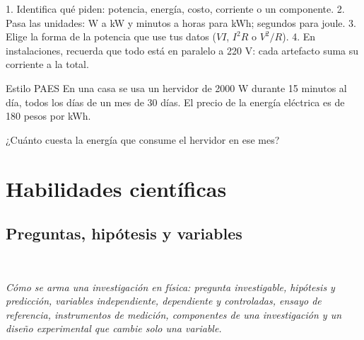 \begin{clave} 1. Identifica qué piden: potencia, energía, costo, corriente o un componente. 2. Pasa las unidades: W a kW y minutos a horas para kWh; segundos para joule. 3. Elige la forma de la potencia que use tus datos ($VI$, $I^2R$ o $V^2/R$). 4. En instalaciones, recuerda que todo está en paralelo a 220 V: cada artefacto suma su corriente a la total.\end{clave}
\begin{elejemplo}{Estilo PAES}
En una casa se usa un hervidor de 2000 W durante 15 minutos al día, todos los días de un mes de 30 días. El precio de la energía eléctrica es de 180 pesos por kWh.

¿Cuánto cuesta la energía que consume el hervidor en ese mes?
\end{elejemplo}

\chapter{Habilidades científicas}
\section[Preguntas, hipótesis y variables]{Preguntas, hipótesis y variables}
\modcomun\ \ {\color{gris}\itshape Cómo se arma una investigación en física: pregunta investigable, hipótesis y predicción, variables independiente, dependiente y controladas, ensayo de referencia, instrumentos de medición, componentes de una investigación y un diseño experimental que cambie solo una variable.\par}
